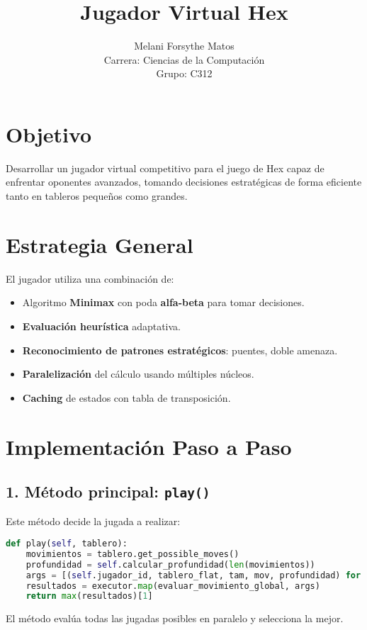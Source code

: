 \documentclass[12pt]{article}
\title{Jugador Virtual Hex}
\author{Melani Forsythe Matos \\ Carrera: Ciencias de la Computación \\ Grupo: C312}
\date{}
\begin{document}
\maketitle

\section{Objetivo}
Desarrollar un jugador virtual competitivo para el juego de Hex capaz de enfrentar oponentes avanzados, tomando decisiones estratégicas de forma eficiente tanto en tableros pequeños como grandes.

\section{Estrategia General}
El jugador utiliza una combinación de:
\begin{itemize}
  \item Algoritmo \textbf{Minimax} con poda \textbf{alfa-beta} para tomar decisiones.
  \item \textbf{Evaluación heurística} adaptativa.
  \item \textbf{Reconocimiento de patrones estratégicos}: puentes, doble amenaza.
  \item \textbf{Paralelización} del cálculo usando múltiples núcleos.
  \item \textbf{Caching} de estados con tabla de transposición.
\end{itemize}

\section{Implementación Paso a Paso}

\subsection{1. Método principal: \texttt{play()}}
Este método decide la jugada a realizar:

\begin{lstlisting}[language=Python]
def play(self, tablero):
    movimientos = tablero.get_possible_moves()
    profundidad = self.calcular_profundidad(len(movimientos))
    args = [(self.jugador_id, tablero_flat, tam, mov, profundidad) for mov in movimientos]
    resultados = executor.map(evaluar_movimiento_global, args)
    return max(resultados)[1]
\end{lstlisting}

El método evalúa todas las jugadas posibles en paralelo y selecciona la mejor.
\end{document}
